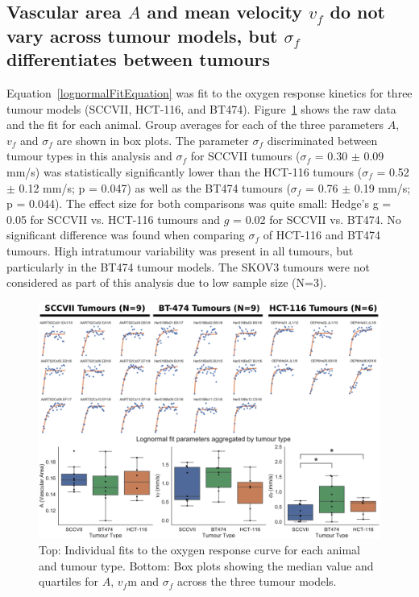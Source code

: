 \subsection{Vascular area $A$ and mean velocity $v_f$ do not vary across tumour models, but $\sigma_f$ differentiates between tumours}
\label{sec:lognormalfitting_results}
Equation~\ref{lognormalFitEquation} was fit to the oxygen response kinetics for three tumour models (SCCVII, HCT-116, and BT474).
Figure~\ref{fig:lognormal_CHB} shows the raw data and the fit for each animal. 
Group averages for each of the three parameters $A$, $v_f$ and $\sigma_f$ are shown in box plots.
The parameter $\sigma_f$ discriminated between tumour types in this analysis and $\sigma_f$ for SCCVII tumours ($\sigma_f$ = 0.30 $\pm$ 0.09 mm/s) was statistically significantly lower than the HCT-116 tumours ($\sigma_f$ = 0.52 $\pm$ 0.12 mm/s; p = 0.047) as well as the BT474 tumours ($\sigma_f$ = 0.76 $\pm$ 0.19 mm/s; p = 0.044).
The effect size for both comparisons was quite small: Hedge's g = 0.05 for SCCVII vs. HCT-116 tumours and $g$ = 0.02 for SCCVII vs. BT474. 
No significant difference was found when comparing $\sigma_f$ of HCT-116 and BT474 tumours.
High intratumour variability was present in all tumours, but particularly in the BT474 tumour models.
The SKOV3 tumours were not considered as part of this analysis due to low sample size (N=3). 

\begin{figure}[htbp]
   \centering
   \includegraphics[width=\textwidth]{oemri_thesis2/oemri_thesis2-images/lognormalFittingAgg_CHB.png} %
   \caption{Top: Individual fits to the oxygen response curve for each animal and tumour type.
   Bottom: Box plots showing the median value and quartiles for $A$, $v_f$m and $\sigma_f$ across the three tumour models.}
   \label{fig:lognormal_CHB}
\end{figure}

